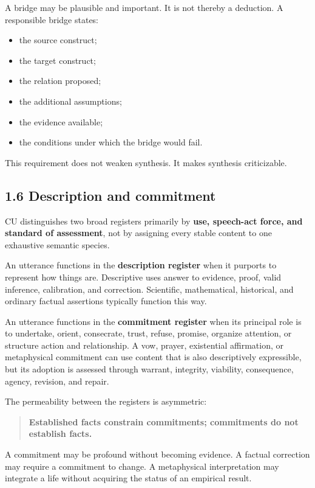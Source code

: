 \documentclass[
  11pt,
]{article}
\providecommand{\tightlist}{%
  \setlength{\itemsep}{0pt}\setlength{\parskip}{0pt}}
\begin{document}
A bridge may be plausible and important. It is not thereby a deduction.
A responsible bridge states:

\begin{itemize}
\tightlist
\item
  the source construct;
\item
  the target construct;
\item
  the relation proposed;
\item
  the additional assumptions;
\item
  the evidence available;
\item
  the conditions under which the bridge would fail.
\end{itemize}

This requirement does not weaken synthesis. It makes synthesis
criticizable.

\subsection{1.6 Description and
commitment}\label{description-and-commitment}

CU distinguishes two broad registers primarily by \textbf{use,
speech-act force, and standard of assessment}, not by assigning every
stable content to one exhaustive semantic species.

An utterance functions in the \textbf{description register} when it
purports to represent how things are. Descriptive uses answer to
evidence, proof, valid inference, calibration, and correction.
Scientific, mathematical, historical, and ordinary factual assertions
typically function this way.

An utterance functions in the \textbf{commitment register} when its
principal role is to undertake, orient, consecrate, trust, refuse,
promise, organize attention, or structure action and relationship. A
vow, prayer, existential affirmation, or metaphysical commitment can use
content that is also descriptively expressible, but its adoption is
assessed through warrant, integrity, viability, consequence, agency,
revision, and repair.

The permeability between the registers is asymmetric:

\begin{quote}
\textbf{Established facts constrain commitments; commitments do not
establish facts.}
\end{quote}

A commitment may be profound without becoming evidence. A factual
correction may require a commitment to change. A metaphysical
interpretation may integrate a life without acquiring the status of an
empirical result.
\end{document}
